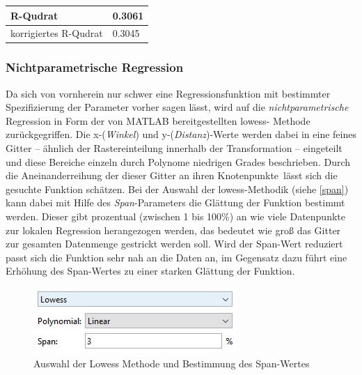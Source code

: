 \tablehead{}
\tabletail{}
\tablelasttail{}
\begin{center}%
\begin{supertabular}{ | P{6cm} | P{3cm}  |}
\textsf{R-Qudrat} 	& 0.3061	\\
\hline
\textsf{korrigiertes R-Qudrat} 	&  0.3045	\\
\hline
\end{supertabular}
\end{center}

\subsubsection{Nichtparametrische Regression}
\label{wdnr}
Da sich von vornherein nur schwer eine Regressionsfunktion mit bestimmter Spezifizierung der Parameter vorher sagen lässt, wird auf die \textit{nichtparametrische} Regression in Form der von MATLAB bereitgestellten \gls{lowess}- Methode zurückgegriffen. Die x-(\textit{Winkel}) und y-(\textit{Distanz})-Werte werden dabei in eine feines Gitter -- ähnlich der Rastereinteilung innerhalb der Transformation -- eingeteilt und diese Bereiche einzeln durch Polynome niedrigen Grades beschrieben. Durch die Aneinanderreihung der dieser Gitter an ihren \glqq Knotenpunkte\grqq~lässt sich die gesuchte Funktion schätzen. Bei der Auswahl der \gls{lowess}-Methodik (siehe \vref{span}) kann dabei mit Hilfe des \textit{Span}-Parameters die Glättung der Funktion bestimmt werden. Dieser gibt prozentual (zwischen 1 bis 100\%) an wie viele Datenpunkte zur lokalen Regression herangezogen werden, das bedeutet wie groß das Gitter zur gesamten Datenmenge gestrickt werden soll. Wird der Span-Wert reduziert passt sich die Funktion sehr nah an die Daten an, im Gegensatz dazu führt eine Erhöhung des Span-Wertes zu einer starken Glättung der Funktion.

\begin{figure}[H]
\centering
\includegraphics[scale=0.9]{se-wa-jpg/span}
\caption{Auswahl der Lowess Methode und Bestimmung des Span-Wertes}
\label{span}
\end{figure}

